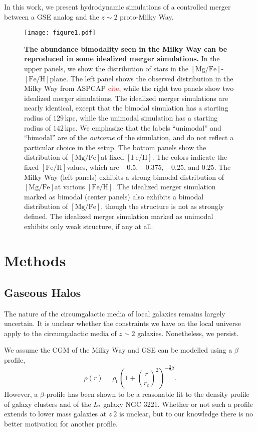 \documentclass[linenumbers, twocolumn]{aastex631}
\newcommand{\kpc}{\ensuremath{\textrm{kpc}}}
\newcommand{\FeH}{\ensuremath{[\textrm{Fe}/\textrm{H}]}}
\newcommand{\MgFe}{\ensuremath{[\textrm{Mg}/\textrm{Fe}]}}
\newcommand{\red}[1]{\textcolor{red}{#1}}
\begin{document}
In this work, we present hydrodynamic simulations of a controlled merger between
a GSE analog and the $z\sim2$ proto-Milky Way. 

\begin{figure*}
  \centering
  \texttt{[image: figure1.pdf]}
  \caption{\textbf{The abundance bimodality seen in the Milky Way can be reproduced in some idealized merger simulations.} In the upper panels, we show the distribution of stars in the \MgFe-\FeH plane. The left panel shows the observed distribution in the Milky Way from ASPCAP \red{cite}, while the right two panels show two idealized merger simulations. The idealized merger simulations are nearly identical, except that the bimodal simulation has a starting radius of $129\,\kpc$, while the unimodal simulation has a starting radius of $142\,\kpc$. We emphasize that the labels ``unimodal'' and ``bimodal'' are of the \textit{outcome} of the simulation, and do not reflect a particular choice in the setup. The bottom panels show the distribution of \MgFe at fixed \FeH. The colors indicate the fixed \FeH values, which are $-0.5$, $-0.375$, $-0.25$, and $0.25$. The Milky Way (left panels) exhibits a strong bimodal distribution of \MgFe at various \FeH. The idealized merger simulation marked as bimodal (center panels) also exhibits a bimodal distribution of \MgFe, though the structure is not as strongly defined. The idealized merger simulation marked as unimodal exhibits only weak structure, if any at all.}
  \label{fig:fig1}
\end{figure*}

\section{Methods}\label{sec:methods}

\subsection{Gaseous Halos}\label{ssec:gashalo} 

The nature of the circumgalactic media of local galaxies remains largely
uncertain. It is unclear whether the constraints we have on the local universe
apply to the circumgalactic media of $z\sim2$ galaxies. Nonetheless, we persist.

We assume the CGM of the Milky Way and GSE can be modelled using a $\beta$ profile,
\begin{equation}
  \rho(r) = \rho_0 \left( 1 + \left(\frac{r}{r_c}\right)^2 \right)^{-\frac{3}{2}\beta}\textrm{.}
\end{equation}
However, a $\beta$-profile has been shown to be a reasonable fit to the density
profile of galaxy clusters and of the $L_{*}$ galaxy NGC 3221. Whether or not
such a profile extends to lower mass galaxies at $z~2$ is unclear, but to our
knowledge there is no better motivation for another profile.
\end{document}
